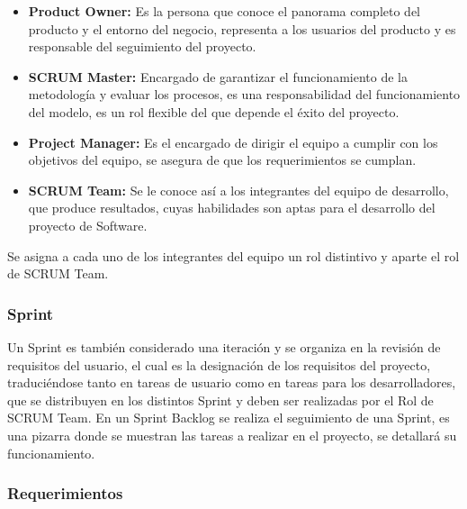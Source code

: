 \begin{itemize}
	\item \textbf{Product Owner:} Es la persona que conoce el panorama completo del producto y el entorno del negocio, representa a los usuarios del producto y es responsable del seguimiento del proyecto.
	\item \textbf{SCRUM Master:} Encargado de garantizar el funcionamiento de la metodología y evaluar los procesos, es una responsabilidad del funcionamiento del modelo, es un rol flexible del que depende el éxito del proyecto.
	\item \textbf{Project Manager:} Es el encargado de dirigir el equipo a cumplir con los objetivos del equipo, se asegura de que los requerimientos se cumplan.
	\item \textbf{SCRUM Team:} Se le conoce así a los integrantes del equipo de desarrollo, que produce resultados, cuyas habilidades son aptas para el desarrollo del proyecto de Software.
\end{itemize}

Se asigna a cada uno de los integrantes del equipo un rol distintivo y aparte el rol de SCRUM Team.

\subsubsection{Sprint}

Un Sprint es también considerado una iteración y se organiza en la revisión de requisitos del usuario, el cual es la designación de los requisitos del proyecto, traduciéndose tanto en tareas de usuario como en tareas para los desarrolladores, que se distribuyen en los distintos Sprint y deben ser realizadas por el Rol de SCRUM Team. En un Sprint Backlog se realiza el seguimiento de una Sprint, es una pizarra donde se muestran las tareas a realizar en el proyecto, se detallará su funcionamiento.

\subsubsection{Requerimientos}

